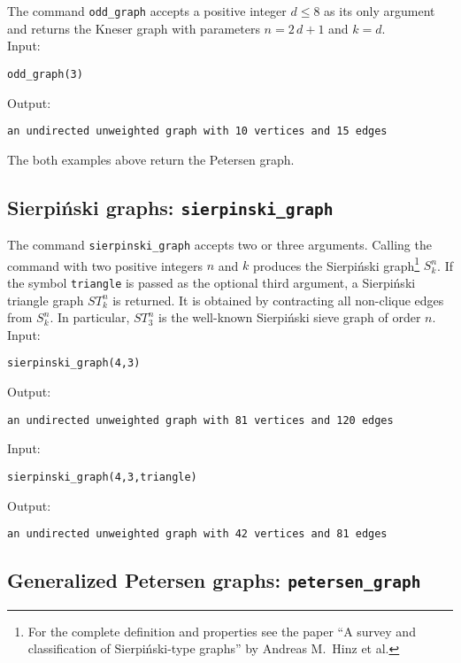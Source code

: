 \documentclass[a4paper,11pt]{article}
\begin{document}
The command {\tt odd\_graph} accepts a positive integer $ d\leq 8 $ as its only argument and returns the Kneser graph with parameters $ n=2\,d+1 $ and $ k=d $.\\
Input:
\begin{center}
  \tt odd\_graph(3)
\end{center}
Output:
\begin{center}
  \tt an undirected unweighted graph with 10 vertices and 15 edges
\end{center}
The both examples above return the Petersen graph.

\subsection{Sierpiński graphs: {\tt sierpinski\_graph}}

The command {\tt sierpinski\_graph} accepts two or three arguments. Calling the command with two positive integers $ n $ and $ k $ produces the Sierpiński graph\footnote{For the complete definition and properties see the paper ``A survey and classification of Sierpiński-type
graphs'' by Andreas M.~Hinz et al.} $ S_k^n $. If the symbol {\tt triangle} is passed as the optional third argument, a Sierpiński triangle graph $ ST_k^n $ is returned. It is obtained by contracting all non-clique edges from $ S_k^n $. In particular, $ ST_3^n $ is the well-known Sierpiński sieve graph of order $ n $.\\
Input:
\begin{center}
  \tt sierpinski\_graph(4,3)
\end{center}
Output:
\begin{center}
  \tt an undirected unweighted graph with 81 vertices and 120 edges
\end{center}
Input:
\begin{center}
  \tt sierpinski\_graph(4,3,triangle)
\end{center}
Output:
\begin{center}
  \tt an undirected unweighted graph with 42 vertices and 81 edges
\end{center}

\subsection{Generalized Petersen graphs: {\tt petersen\_graph}}
\end{document}
